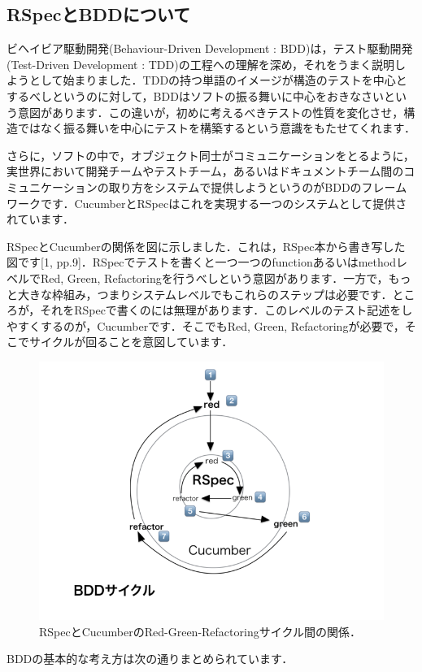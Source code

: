 
\subsection{RSpecとBDDについて}
ビヘイビア駆動開発(Behaviour-Driven Development : BDD)は，テスト駆動開発(Test-Driven Development : TDD)の工程への理解を深め，それをうまく説明しようとして始まりました．TDDの持つ単語のイメージが構造のテストを中心とするべしというのに対して，BDDはソフトの振る舞いに中心をおきなさいという意図があります．この違いが，初めに考えるべきテストの性質を変化させ，構造ではなく振る舞いを中心にテストを構築するという意識をもたせてくれます．

さらに，ソフトの中で，オブジェクト同士がコミュニケーションをとるように，実世界において開発チームやテストチーム，あるいはドキュメントチーム間のコミュニケーションの取り方をシステムで提供しようというのがBDDのフレームワークです．CucumberとRSpecはこれを実現する一つのシステムとして提供されています．

RSpecとCucumberの関係を図に示しました．これは，RSpec本から書き写した図です[1, pp.9]．RSpecでテストを書くと一つ一つのfunctionあるいはmethodレベルでRed, Green, Refactoringを行うべしという意図があります．一方で，もっと大きな枠組み，つまりシステムレベルでもこれらのステップは必要です．ところが，それをRSpecで書くのには無理があります．このレベルのテスト記述をしやすくするのが，Cucumberです．そこでもRed, Green, Refactoringが必要で，そこでサイクルが回ることを意図しています．

\begin{figure}[htbp]\begin{center}
\includegraphics[width=12cm,bb= 0 0 937 753]{../figs/./my_help_nasu.png}
\caption{RSpecとCucumberのRed-Green-Refactoringサイクル間の関係．}
\label{default}\end{center}\end{figure}
BDDの基本的な考え方は次の通りまとめられています．

